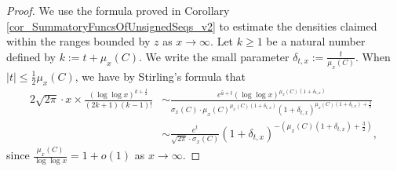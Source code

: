 \documentclass[11pt,reqno,a4letter]{article}
\numberwithin{figure}{section}
\numberwithin{table}{section}
\theoremstyle{plain}
\numberwithin{theorem}{section}
\theoremstyle{definition}
\begin{document}
\begin{proof}
We use the formula proved in Corollary \ref{cor_SummatoryFuncsOfUnsignedSeqs_v2} 
to estimate the densities claimed within the ranges bounded by 
$z$ as $x \rightarrow \infty$. 
Let $k \geq 1$ be a natural number defined by $k := t + \mu_x(C)$. 
We write the small parameter $\delta_{t,x} := \frac{t}{\mu_x(C)}$. 
When $|t| \leq \frac{1}{2} \mu_x(C)$, we have by Stirling's formula that 
\begin{align*} 
2\sqrt{2\pi} \cdot x \times 
     \frac{(\log\log x)^{k+\frac{1}{2}}}{(2k+1)(k-1)!} & \sim 
     \frac{e^{\hat{a} + t} 
     (\log\log x)^{\mu_x(C)(1+\delta_{t,x})}}{ 
     \sigma_x(C) \cdot \mu_x(C)^{\mu_x(C) (1 + \delta_{t,x})}
     (1 + \delta_{t,x})^{\mu_x(C) (1 + \delta_{t,x}) + \frac{3}{2}}} \\ 
     & \sim \frac{e^{t}}{\sqrt{2\pi} \cdot \sigma_x(C)} (1 + \delta_{t,x})^{-\left( 
     \mu_x(C) (1 + \delta_{t,x}) + \frac{3}{2}\right)}, 
\end{align*} 
since $\frac{\mu_x(C)}{\log\log x} = 1 + o(1)$ as $x \rightarrow \infty$. 


\end{proof}
\end{document}

